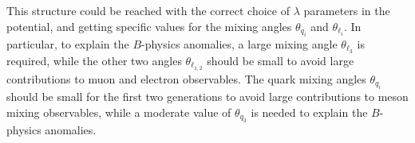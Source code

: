 This structure could be reached with the correct choice of $\lambda$ parameters in the potential, and getting specific values for the mixing angles $\theta_{q_i}$ and $\theta_{\ell_i}$. In particular, to explain the $B$-physics anomalies, a large mixing angle $\theta_{\ell_3}$ is required, while the other two angles $\theta_{\ell_{1,2}}$ should be small to avoid large contributions to muon and electron observables. The quark mixing angles $\theta_{q_i}$ should be small for the first two generations to avoid large contributions to meson mixing observables, while a moderate value of $\theta_{q_3}$ is needed to explain the $B$-physics anomalies.
